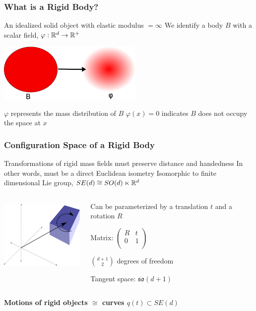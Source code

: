 \documentclass{beamer}
\begin{document}
\begin{frame}
\frametitle{What is a Rigid Body?}
An idealized solid object with elastic modulus $= \infty$
\pause
\vskip5pt
We identify a body $B$ with a scalar field, $\varphi : \mathbb{R}^d \to \mathbb{R}^+$
\vskip5pt
\begin{center}
\includegraphics[height=1.1in]{figures/massfield.png}
\end{center}
\pause
\vskip5pt
$\varphi$ represents the mass distribution of $B$
\pause
\vskip5pt
$\varphi(x) = 0$ indicates $B$ does not occupy the space at $x$
\end{frame}

\begin{frame}
\frametitle{Configuration Space of a Rigid Body}
Transformations of rigid mass fields must preserve distance and handedness
\pause
\vskip5pt
In other words, must be a direct Euclidean isometry
\vskip5pt
Isomorphic to finite dimensional Lie group, $SE(d) \cong SO(d) \ltimes \mathbb{R}^d$
\vskip5pt
\pause
\begin{columns}
		\begin{center}
		\includegraphics[height=1.4in]{figures/rigidbody.png}
		\end{center}
		
		\begin{center}
		Can be parameterized by a translation $t$ and a rotation $R$
		
		\vskip15pt
		
		Matrix:
		$\left( \begin{array}{cc}
			R & t \\
			0 & 1 \\
		\end{array} \right)$
		
		\vskip15pt
		${d+1 \choose{2}}$ degrees of freedom
		
		\vskip15pt
		Tangent space: $\mathfrak{so}(d+1)$
		\end{center}
\end{columns}
\pause
\vskip10pt
\begin{center}
\bf{Motions of rigid objects $\cong$ curves $q(t) \subset SE(d)$}
\end{center}
\end{frame}
\end{document}

